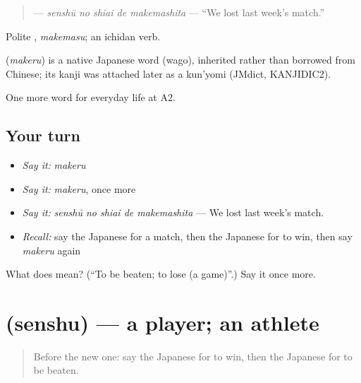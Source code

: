 \begin{quote}
\textbf{  } — \emph{senshū no shiai de makemashita} — \textquotedblleft{}We lost last week's match.\textquotedblright{}
\end{quote}

Polite \textbf{}, \emph{makemasu}; an ichidan verb.

\begin{cousinweb}
\textbf{} (\emph{makeru}) is a native Japanese word (wago), inherited rather than borrowed from Chinese; its kanji was attached later as a kun'yomi (JMdict, KANJIDIC2).
\end{cousinweb}

\begin{grammarlens}[title={What you've built}]
One more word for everyday life at A2.
\end{grammarlens}

\subsection*{Your turn}
\begin{itemize}
\raggedright
  \item \emph{Say it:} \emph{makeru}
  \item \emph{Say it:} \emph{makeru}, once more
  \item \emph{Say it:} \emph{senshū no shiai de makemashita} — We lost last week's match.
  \item \emph{Recall:} say the Japanese for a match, then the Japanese for to win, then say \emph{makeru} again
\end{itemize}

\begin{tcolorbox}[breakable,colback=teal!4,colframe=teal!35!black,title={Before you move on}]
What does  mean? (\textquotedblleft{}To be beaten; to lose (a game)\textquotedblright{}.) Say it once more.
\end{tcolorbox}
\section[\texorpdfstring{\ja{せんしゅ} (senshu)}{せんしゅ (senshu)}]{ (senshu) — a player; an athlete}

\label{lesson:JA-C234-senshu}



\begin{quote}
Before the new one: say the Japanese for to win, then the Japanese for to be beaten.
\end{quote}

